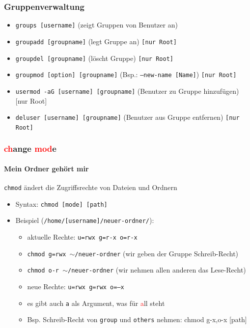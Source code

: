 \documentclass[12pt,utf8, handout]{beamer}
\begin{document}
\begin{frame}
\frametitle{Gruppenverwaltung}
\begin{itemize}[<+->]
	\item \texttt{groups [username]} (zeigt Gruppen von Benutzer an)
	\item \texttt{groupadd [groupname]} (legt Gruppe an) \texttt{[nur Root]}
	\item \texttt{groupdel [groupname]} (löscht Gruppe) \texttt{[nur Root]}
	\item \texttt{groupmod [option] [groupname]} (Bsp.: \texttt{--new-name [Name]}) \texttt{[nur Root]}
	\item \texttt{usermod -aG [username] [groupname]} (Benutzer zu Gruppe hinzufügen) [nur Root]
	\item \texttt{deluser [username] [groupname]} (Benutzer aus Gruppe entfernen) \texttt{[nur Root]}
\end{itemize}
\end{frame}

\begin{frame}
\frametitle{\textcolor{red}{ch}ange \textcolor{red}{mod}e}
\framesubtitle{\textcolor{ownDarkOr}{Mein Ordner gehört mir}}
\texttt{chmod} ändert die Zugriffsrechte von Dateien und Ordnern
\begin{itemize}[<+->]
	\item Syntax: \texttt{chmod [mode] [path]}
	\item Beispiel (\texttt{/home/[username]/neuer-ordner/}):
	\begin{itemize}[<+->]
		\item aktuelle Rechte: \texttt{u=rwx g=r-x o=r-x}
		\item \texttt{chmod g=rwx $\sim$/neuer-ordner} (wir geben der Gruppe Schreib-Recht)
		\item \texttt{chmod o-r $\sim$/neuer-ordner} (wir nehmen allen anderen das Lese-Recht)
		\item neue Rechte: \texttt{u=rwx g=rwx o=--x}
		\item es gibt auch \texttt{a} als Argument, was für \textcolor{red}{a}ll steht
		\item Bsp. Schreib-Recht von \texttt{group} und \texttt{others} nehmen: chmod g-x,o-x [path] 	
	\end{itemize}
\end{itemize}
\end{frame}
\end{document}
